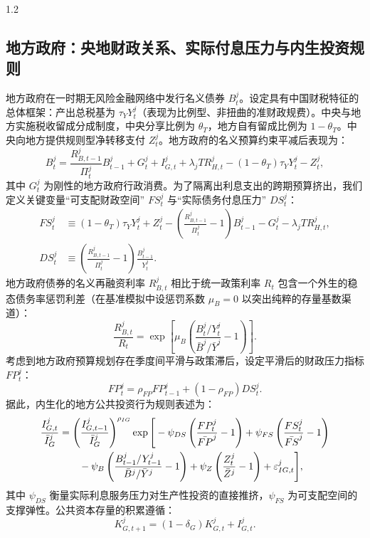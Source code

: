 \documentclass[12pt,UTF8]{ctexart}
\begin{document}
\begin{spacing}{1.2}
		\subsection{地方政府：央地财政关系、实际付息压力与内生投资规则}
		
		地方政府在一时期无风险金融网络中发行名义债券 $B_t^j$。设定具有中国财税特征的总体框架：产出总税基为 $\tau_Y Y_t^j$（表现为比例型、非扭曲的准财政规费）。中央与地方实施税收留成分成制度，中央分享比例为 $\theta_T$，地方自有留成比例为 $1-\theta_T$。中央向地方提供规则型净转移支付 $Z_t^j$。地方政府的名义预算约束平减后表现为：
		\begin{equation}
			B_t^j=\frac{R_{B,t-1}^j}{\Pi_t^j}B_{t-1}^j
			+G_t^j+I_{G,t}^j+\lambda_jTR_{H,t}^j
			-(1-\theta_T)\tau_Y Y_t^j-Z_t^j,
			\label{eq:gov_budget}
		\end{equation}
		其中 $G_t^j$ 为刚性的地方政府行政消费。为了隔离出利息支出的跨期预算挤出，我们定义关键变量“可支配财政空间” $FS_t^j$ 与“实际债务付息压力” $DS_t^j$：
		\begin{align}
			FS_t^j &\equiv (1-\theta_T)\tau_Y Y_t^j+Z_t^j -\left(\frac{R_{B,t-1}^j}{\Pi_t^j}-1\right)B_{t-1}^j -G_t^j-\lambda_jTR_{H,t}^j, \label{eq:FS} \\
			DS_t^j &\equiv \left(\frac{R_{B,t-1}^j}{\Pi_t^j}-1\right)\frac{B_{t-1}^j}{Y_t^j}.
			\label{eq:DS}
		\end{align}
		地方政府债券的名义再融资利率 $R_{B,t}^j$ 相比于统一政策利率 $R_t$ 包含一个外生的稳态债务率惩罚利差（在基准模拟中设惩罚系数 $\mu_B=0$ 以突出纯粹的存量基数渠道）：
		\begin{equation}
			\frac{R_{B,t}^j}{R_t}=\exp\left[\mu_B\left(\frac{B_t^j/Y_t^j}{\bar B^j/\bar Y^j}-1\right)\right].
			\label{eq:local_rate}
		\end{equation}
		考虑到地方政府预算规划存在季度间平滑与政策滞后，设定平滑后的财政压力指标 $FP_t^j$：
		\begin{equation}
			FP_t^j=\rho_{FP}FP_{t-1}^j+(1-\rho_{FP})DS_t^j.
			\label{eq:FP}
		\end{equation}
		据此，内生化的地方公共投资行为规则表述为：
		\begin{align}
			\frac{I_{G,t}^j}{\bar I_G^j}
			&=\left(\frac{I_{G,t-1}^j}{\bar I_G^j}\right)^{\rho_{IG}}
			\exp\Bigg[
			-\psi_{DS}\left(\frac{FP_t^j}{\bar{FP}^j}-1\right)
			+\psi_{FS}\left(\frac{FS_t^j}{\bar{FS}^j}-1\right)\notag\\
			&\qquad
			-\psi_B\left(\frac{B_{t-1}^j/Y_{t-1}^j}{\bar B^j/\bar Y^j}-1\right)
			+\psi_Z\left(\frac{Z_t^j}{\bar Z^j}-1\right)
			+\varepsilon_{IG,t}^j
			\Bigg],
			\label{eq:IG_rule}
		\end{align}
		其中 $\psi_{DS}$ 衡量实际利息服务压力对生产性投资的直接推挤，$\psi_{FS}$ 为可支配空间的支撑弹性。公共资本存量的积累遵循：
		\begin{equation}
			K_{G,t+1}^j=(1-\delta_G)K_{G,t}^j+I_{G,t}^j.
			\label{eq:KG_law}
		\end{equation}
		

\end{spacing}
\end{document}
